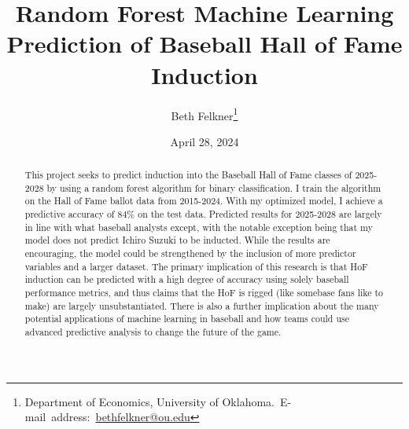 \documentclass[12pt,english]{article}
\begin{document}
\begin{singlespace}
\title{Random Forest Machine Learning Prediction of Baseball Hall of Fame Induction}
\end{singlespace}

\author{Beth Felkner\thanks{Department of Economics, University of Oklahoma.\
E-mail~address:~\href{mailto:student.name@ou.edu}{bethfelkner@ou.edu}}}

\date{April 28, 2024}

\maketitle

\begin{abstract}
\begin{singlespace}
This project seeks to predict induction into the Baseball Hall of Fame classes of 2025-2028 by using a random forest algorithm for binary classification. I train the algorithm on the Hall of Fame ballot data from 2015-2024. With my optimized model, I achieve a predictive accuracy of 84\% on the test data. Predicted results for 2025-2028 are largely in line with what baseball analysts except, with the notable exception being that my model does not predict Ichiro Suzuki to be inducted. While the results are encouraging, the model could be strengthened by the inclusion of more predictor variables and a larger dataset. The primary implication of this research is that HoF induction can be predicted with a high degree of accuracy using solely baseball performance metrics, and thus claims that the HoF is rigged (like somebase fans like to make) are largely unsubstantiated. There is also a further implication about the many potential applications of machine learning in baseball and how teams could use advanced predictive analysis to change the future of the game. 
\end{singlespace}

\end{abstract}
\vfill{}

\pagebreak{}
\end{document}
